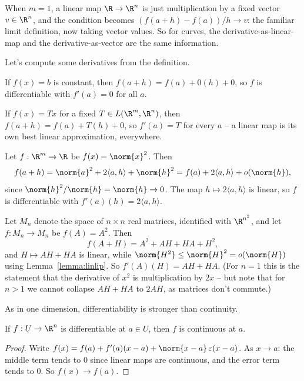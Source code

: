 \begin{remark}
    When $m = 1$, a linear map $\R \rightarrow \R^n$ is just multiplication by a fixed vector $v \in \R^n$, and the condition becomes $(f(a + h) - f(a))/h \rightarrow v$: the familiar limit definition, now taking vector values. So for curves, the derivative-as-linear-map and the derivative-as-vector are the same information.
\end{remark}

Let's compute some derivatives from the definition.

\begin{example}
    If $f(x) = b$ is constant, then $f(a + h) = f(a) + 0(h) + 0$, so $f$ is differentiable with $f'(a) = 0$ for all $a$.

    If $f(x) = Tx$ for a fixed $T \in L(\R^m, \R^n)$, then $f(a + h) = f(a) + T(h) + 0$, so $f'(a) = T$ for every $a$ -- a linear map is its own best linear approximation, everywhere.
\end{example}

\begin{example}
    Let $f: \R^m \rightarrow \R$ be $f(x) = \norm{x}^2$. Then
    $$
    f(a + h) = \norm{a}^2 + 2\langle a, h\rangle + \norm{h}^2 = f(a) + 2\langle a, h \rangle + o(\norm{h}),
    $$
    since $\norm{h}^2/\norm{h} = \norm{h} \rightarrow 0$. The map $h \mapsto 2\langle a, h\rangle$ is linear, so $f$ is differentiable with $f'(a)(h) = 2\langle a, h\rangle$.
\end{example}

\begin{example}
    Let $M_n$ denote the space of $n \times n$ real matrices, identified with $\R^{n^2}$, and let $f: M_n \rightarrow M_n$ be $f(A) = A^2$. Then
    $$
    f(A + H) = A^2 + AH + HA + H^2,
    $$
    and $H \mapsto AH + HA$ is linear, while $\norm{H^2} \leq \norm{H}^2 = o(\norm{H})$ using Lemma~\ref{lemma:linlip}. So $f'(A)(H) = AH + HA$. (For $n = 1$ this is the statement that the derivative of $x^2$ is multiplication by $2x$ -- but note that for $n > 1$ we cannot collapse $AH + HA$ to $2AH$, as matrices don't commute.)
\end{example}

As in one dimension, differentiability is stronger than continuity.

\begin{proposition}
    If $f: U \rightarrow \R^n$ is differentiable at $a \in U$, then $f$ is continuous at $a$.
\end{proposition}
\begin{proof}
    Write $f(x) = f(a) + f'(a)(x - a) + \norm{x - a}\,\varepsilon(x - a)$. As $x \rightarrow a$: the middle term tends to $0$ since linear maps are continuous, and the error term tends to $0$. So $f(x) \rightarrow f(a)$.
\end{proof}

